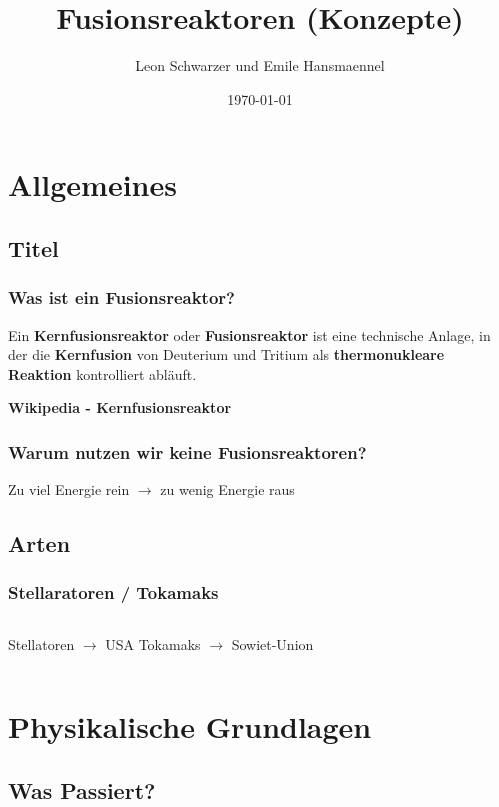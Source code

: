 \documentclass[aspectratio=169]{beamer}
\title{Fusionsreaktoren (Konzepte)}
\subtitle{}
\author{Leon Schwarzer und Emile Hansmaennel}
\institute{Theodor-Fliedner-Gymnasium}
\date{\today}
\begin{document}
  \begin{frame}
    \titlepage
  \end{frame}

  \section{Allgemeines}
    \subsection{Titel}

      \begin{frame}
        \frametitle{Was ist ein Fusionsreaktor?}
        Ein \textbf{Kernfusionsreaktor} oder \textbf{Fusionsreaktor} ist eine
        technische Anlage, in der die \textbf{Kernfusion} von Deuterium und Tritium als
        \textbf{thermonukleare Reaktion} kontrolliert abläuft.
        \par
        \raggedleft
        \textbf{Wikipedia - Kernfusionsreaktor}
      \end{frame}

      \begin{frame}
        \frametitle{Warum nutzen wir keine Fusionsreaktoren?}
        \center
        Zu viel Energie rein \( \rightarrow \) zu wenig Energie raus
      \end{frame}

    \subsection{Arten}

      \begin{frame}
        \frametitle{Stellaratoren / Tokamaks}
        \begin{columns}
          \center
          Stellatoren \( \rightarrow \) USA
          \bigskip
          \center
          Tokamaks \( \rightarrow \) Sowiet-Union
        \end{columns}
      \end{frame}

  \section{Physikalische Grundlagen}

    \subsection{Was Passiert?}
\end{document}
